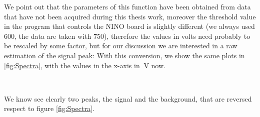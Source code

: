 We point out that the parameters of this function have been obtained from data that have not been acquired during this thesis work, moreover the threshold value in the program that controls the NINO board is slightly different (we always used 600, the data are taken with 750), therefore the values in volts need probably to be rescaled by some factor, but for our discussion we are interested in a raw estimation of the signal peak:
With this conversion, we show the same plots in \ref{fig:Spectra}, with the values in the x-axis in $\SI{}{\volt}$ now.

\begin{figure}[h]
\centering
{}
\\
\end{figure}

We know see clearly two peaks, the signal and the background, that are reversed respect to figure \ref{fig:Spectra}.

